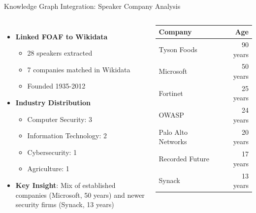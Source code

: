 \documentclass[pdf,aspectratio=169]{beamer}
\begin{document}
\begin{frame}{Knowledge Graph Integration: Speaker Company Analysis}
  \begin{columns}[c]
    \begin{itemize}
    \item \textbf{Linked FOAF to Wikidata}
      \begin{itemize}
      \item 28 speakers extracted
      \item 7 companies matched in Wikidata
      \item Founded 1935-2012
      \end{itemize}
    \item \textbf{Industry Distribution}
      \begin{itemize}
      \item Computer Security: 3
      \item Information Technology: 2
      \item Cybersecurity: 1
      \item Agriculture: 1
      \end{itemize}
    \item \textbf{Key Insight}: Mix of established companies (Microsoft, 50 years) and newer security firms (Synack, 13 years)
    \end{itemize}
    
    \small
    \begin{tabular}{lr}
      \hline
      \textbf{Company} & \textbf{Age} \\
      \hline
      Tyson Foods & 90 years \\
      Microsoft & 50 years \\
      Fortinet & 25 years \\
      OWASP & 24 years \\
      Palo Alto Networks & 20 years \\
      Recorded Future & 17 years \\
      Synack & 13 years \\
      \hline
    \end{tabular}
  \end{columns}
\end{frame}
\end{document}

